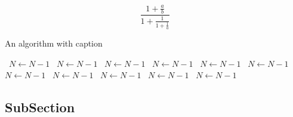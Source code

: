 \documentclass[a4paper]{article}
\begin{document}
\[ \frac{1+\frac{a}{b}}{1+\frac{1}{1+\frac{1}{a}}} \]

\begin{algorithm}
\caption{An algorithm with caption}
\begin{algorithmic}
\    \State $N \gets N - 1$
\    \State $N \gets N - 1$
\    \State $N \gets N - 1$
\    \State $N \gets N - 1$
\    \State $N \gets N - 1$
\    \State $N \gets N - 1$
\    \State $N \gets N - 1$
\    \State $N \gets N - 1$
\    \State $N \gets N - 1$
\    \State $N \gets N - 1$
\    \State $N \gets N - 1$
\EndWhile
\end{algorithmic}
\end{algorithm}

\subsection{SubSection}
\end{document}
